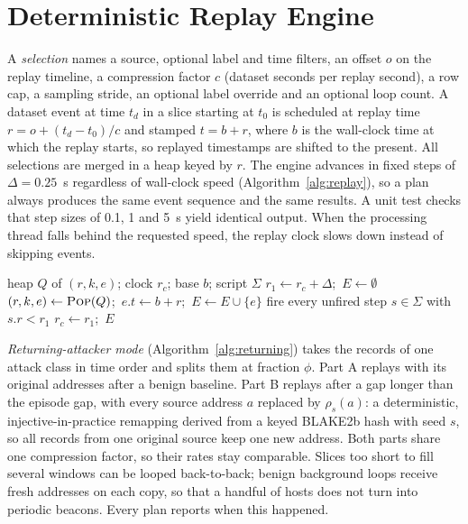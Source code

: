 \documentclass[conference]{IEEEtran}
\begin{document}
\section{Deterministic Replay Engine}\label{sec:replay}
A \emph{selection} names a source, optional label and time filters, an offset $o$ on the replay timeline, a compression factor $c$ (dataset seconds per replay second), a row cap, a sampling stride, an optional label override and an optional loop count. A dataset event at time $t_d$ in a slice starting at $t_0$ is scheduled at replay time $r=o+(t_d-t_0)/c$ and stamped $t=b+r$, where $b$ is the wall-clock time at which the replay starts, so replayed timestamps are shifted to the present. All selections are merged in a heap keyed by $r$. The engine advances in fixed steps of $\Delta=0.25$~s regardless of wall-clock speed (Algorithm~\ref{alg:replay}), so a plan always produces the same event sequence and the same results. A unit test checks that step sizes of 0.1, 1 and 5~s yield identical output. When the processing thread falls behind the requested speed, the replay clock slows down instead of skipping events.

\begin{algorithm}[t]
\caption{Deterministic replay step}\label{alg:replay}
\small
\begin{algorithmic}[1]
\Require heap $Q$ of $(r, k, e)$; clock $r_c$; base $b$; script $\Sigma$
\State $r_1 \gets r_c+\Delta$;\ $E\gets\emptyset$
  \State $(r,k,e)\gets \textsc{Pop}(Q)$;\ $e.t\gets b+r$;\ $E\gets E\cup\{e\}$
\EndWhile
\State fire every unfired step $s\in\Sigma$ with $s.r<r_1$ 
\State $r_c\gets r_1$;\ \Return $E$
\end{algorithmic}
\end{algorithm}

\textit{Returning-attacker mode} (Algorithm~\ref{alg:returning}) takes the records of one attack class in time order and splits them at fraction $\phi$. Part A replays with its original addresses after a benign baseline. Part B replays after a gap longer than the episode gap, with every source address $a$ replaced by $\rho_s(a)$: a deterministic, injective-in-practice remapping derived from a keyed BLAKE2b hash with seed $s$, so all records from one original source keep one new address. Both parts share one compression factor, so their rates stay comparable. Slices too short to fill several windows can be looped back-to-back; benign background loops receive fresh addresses on each copy, so that a handful of hosts does not turn into periodic beacons. Every plan reports when this happened.
\end{document}
